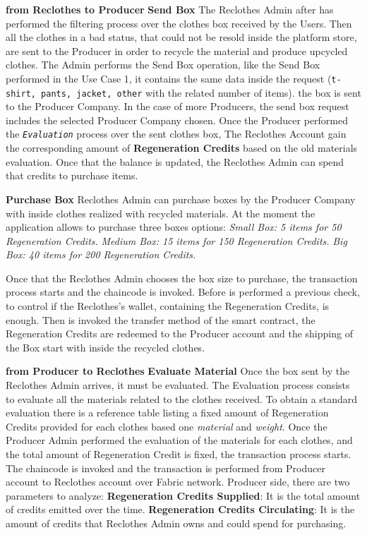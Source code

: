 \begin{outline}[enumerate]
    \1 \textbf{from Reclothes to Producer}   
    \2 \textbf{Send Box}
    \3 The Reclothes Admin after has performed the filtering process over the clothes box received by the Users. 
    Then all the clothes in a bad status, that could not be resold inside the platform store, are sent to the 
    Producer in order to recycle the material and produce upcycled clothes. The Admin performs the Send Box 
    operation, like the Send Box performed in the Use Case 1, it contains the same data inside the request 
    (\texttt{t-shirt, pants, jacket, other} with the related number of items).  the box is sent to the Producer 
    Company. In the case of more Producers, the send box request includes the selected Producer Company chosen.
    \3 Once the Producer performed the \textit{\texttt{Evaluation}} process over the sent clothes box, 
    The Reclothes Account gain the corresponding amount of \textbf{Regeneration Credits} based on the 
    old materials evaluation. Once that the balance is updated, the Reclothes Admin can spend that 
    credits to purchase items. 
    
    \2 \textbf{Purchase Box}
    \3 Reclothes Admin can purchase boxes by the Producer Company with inside clothes realized with recycled 
    materials. At the moment the application allows to purchase three boxes options: 
    \4 \textit{Small Box: 5 items for 50 Regeneration Credits.}
    \4 \textit{Medium Box: 15 items for 150 Regeneration Credits.} 
    \4 \textit{Big Box: 40 items for 200 Regeneration Credits.}

    \3 Once that the Reclothes Admin chooses the box size to purchase, the transaction process starts and the 
    chaincode is invoked. Before is performed a previous check, to control if the Reclothes's wallet, containing the 
    Regeneration Credits, is enough. Then is invoked the transfer method of the smart contract, the Regeneration Credits are 
    redeemed to the Producer account and the shipping of the Box start with inside the recycled clothes.       

    \1 \textbf{from Producer to Reclothes}
    \2 \textbf{Evaluate Material}
    \3 Once the box sent by the Reclothes Admin arrives, it must be evaluated. The Evaluation process
    consists to evaluate all the materials related to the clothes received. To obtain a standard evaluation
    there is a reference table listing a fixed amount of Regeneration Credits provided for
    each clothes based one \textit{material} and \textit{weight}. Once the Producer Admin performed 
    the evaluation of the materials for each clothes, and the total amount of Regeneration Credit is fixed,
    the transaction process starts. The chaincode is invoked and the transaction is performed from Producer account
    to Reclothes account over Fabric network. Producer side, there are two parameters to analyze:
    \4 \textbf{Regeneration Credits Supplied}: It is the total amount of credits emitted over the time.
    \4 \textbf{Regeneration Credits Circulating}: It is the amount of credits that Reclothes Admin
    owns and could spend for purchasing. 
\end{outline}


